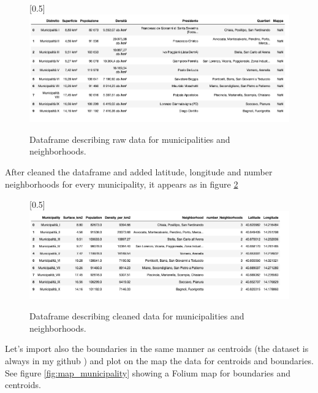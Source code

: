 \documentclass[a4paper, 12pt, oneside]{book}
\begin{document}
\begin{figure}[!htb]
		\centering
		\scalebox{0.45}[0.5]{\includegraphics{immagini/df_mun_raw.png}}
		\caption{Dataframe describing raw data for municipalities and neighborhoods. }
		\label{fig:df_mun_raw}
	\end{figure}

After cleaned the dataframe and added latitude, longitude and number neighborhoods for every municipality, it appears as in figure \ref{fig:df_mun_cleaned}


\begin{figure}[!htb]
		\centering
		\scalebox{0.45}[0.5]{\includegraphics{immagini/df_mun_cleaned.png}}
		\caption{Dataframe describing cleaned data for municipalities and neighborhoods. }
		\label{fig:df_mun_cleaned}
	\end{figure}



Let's import also the boundaries in the same manner as centroids (the dataset is always in my github \cite{dataset}) and plot on the map the data for centroids and boundaries. See figure \ref{fig:map_municipality} showing a Folium map for boundaries and centroids.
\end{document}
